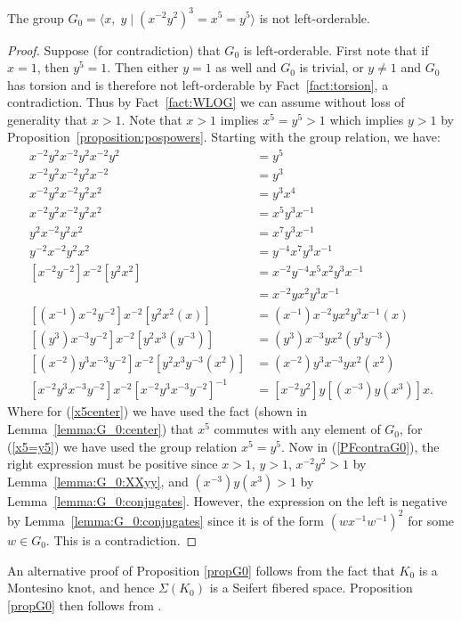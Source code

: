 \begin{proposition}
The group $G_0=\langle x,\; y \mid{} (x^{-2}y^{2})^{3}=x^{5}=y^{5} \rangle$ is not left-orderable.
\label{propG0}
\end{proposition}
\begin{proof} Suppose (for contradiction) that $G_0$ is left-orderable. First note that if $x=1$, then $y^5=1$. Then either $y=1$ as well and $G_0$ is trivial, or $y\neq{}1$ and $G_0$ has torsion and is therefore not left-orderable by Fact~\ref{fact:torsion}, a contradiction. Thus by Fact~\ref{fact:WLOG} we can assume without loss of generality that $x>1$. Note that $x>1$ implies $x^5=y^5>1$ which implies $y>1$ by Proposition~\ref{proposition:pospowers}. Starting with the group relation, we have:
\begin{align}
x^{-2}y^{2}x^{-2}y^{2}x^{-2}y^{2}&=y^{5}\nonumber{}\\
x^{-2}y^{2}x^{-2}y^{2}x^{-2}&=y^{3}\nonumber{}\\
x^{-2}y^{2}x^{-2}y^{2}x^{2}&=y^{3}x^{4}\nonumber{}\\
x^{-2}y^{2}x^{-2}y^{2}x^{2}&=x^{5}y^{3}x^{-1}
\label{x5center}\\
y^{2}x^{-2}y^{2}x^{2} & =x^{7}y^{3}x^{-1}\nonumber{}\\
y^{-2}x^{-2}y^{2}x^{2} & =y^{-4}x^{7}y^{3}x^{-1}\nonumber{}\\
[x^{-2}y^{-2}]x^{-2}[y^{2}x^{2}] & =x^{-2}y^{-4}x^{5}x^{2}y^{3}x^{-1}\nonumber{}\\
& =x^{-2}yx^{2}y^{3}x^{-1}
\label{x5=y5}\\
[(x^{-1})x^{-2}y^{-2}]x^{-2}[y^{2}x^{2}(x)] & =(x^{-1})x^{-2}yx^{2}y^{3}x^{-1}(x)\nonumber{}\\
[(y^{3})x^{-3}y^{-2}]x^{-2}[y^{2}x^{3}(y^{-3})] & =(y^{3})x^{-3}yx^{2}(y^{3}y^{-3})\nonumber{}\\
[(x^{-2})y^{3}x^{-3}y^{-2}]x^{-2}[y^{2}x^{3}y^{-3}(x^{2})] & =(x^{-2})y^{3}x^{-3}yx^{2}(x^{2})\nonumber{}\\
[x^{-2}y^{3}x^{-3}y^{-2}] x^{-2} [x^{-2}y^{3}x^{-3}y^{-2}]^{-1} & =[x^{-2}y^{2}]y[(x^{-3})y(x^{3})]x.
\label{PFcontraG0}
\end{align}
Where for (\ref{x5center}) we have used the fact (shown in Lemma~\ref{lemma:G_0:center}) that $x^5$ commutes with any element of $G_0$, for (\ref{x5=y5}) we have used the group relation $x^{5}=y^{5}$. Now in (\ref{PFcontraG0}), the right expression must be positive since $x>1$, $y>1$, $x^{-2}y^{2}>1$ by Lemma~\ref{lemma:G_0:XXyy}, and $(x^{-3})y(x^{3})>1$ by Lemma~\ref{lemma:G_0:conjugates}. However, the expression on the left is negative by Lemma~\ref{lemma:G_0:conjugates} since it is of the form $(wx^{-1}w^{-1})^{2}$ for some $w\in{}G_0$. This is a contradiction.
\end{proof}

\begin{remark}
An alternative proof of Proposition \ref{propG0} follows from the fact that $K_0$ is a Montesino knot, and hence $\Sigma{}(K_0)$ is a Seifert fibered space. Proposition \ref{propG0} then follows from \cite[Theorem 4]{BoyerGordonWatson}.
\end{remark}